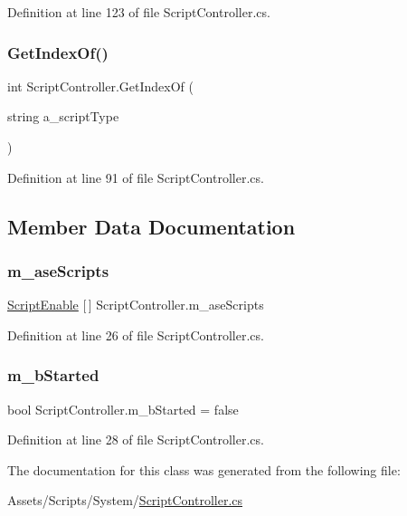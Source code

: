 Definition at line 123 of file Script\+Controller.\+cs.

\mbox{\label{class_script_controller_a211378d77157f39fa7427525542aee2c}} 
\subsubsection{\texorpdfstring{Get\+Index\+Of()}{GetIndexOf()}}
{\footnotesize\ttfamily int Script\+Controller.\+Get\+Index\+Of (\begin{DoxyParamCaption}\item[{string}]{a\+\_\+script\+Type }\end{DoxyParamCaption})}



Definition at line 91 of file Script\+Controller.\+cs.



\subsection{Member Data Documentation}
\mbox{\label{class_script_controller_ad70a0da6b194de9d0b1b254727df3361}} 
\subsubsection{\texorpdfstring{m\+\_\+ase\+Scripts}{m\_aseScripts}}
{\footnotesize\ttfamily \mbox{\hyperlink{struct_script_enable}{Script\+Enable}} \mbox{[}$\,$\mbox{]} Script\+Controller.\+m\+\_\+ase\+Scripts}



Definition at line 26 of file Script\+Controller.\+cs.

\mbox{\label{class_script_controller_a20ad7aed606af1bf812f6e15708b955a}} 
\subsubsection{\texorpdfstring{m\+\_\+b\+Started}{m\_bStarted}}
{\footnotesize\ttfamily bool Script\+Controller.\+m\+\_\+b\+Started = false}



Definition at line 28 of file Script\+Controller.\+cs.



The documentation for this class was generated from the following file\+:\begin{DoxyCompactItemize}
\item 
Assets/\+Scripts/\+System/\mbox{\hyperlink{_script_controller_8cs}{Script\+Controller.\+cs}}\end{DoxyCompactItemize}
